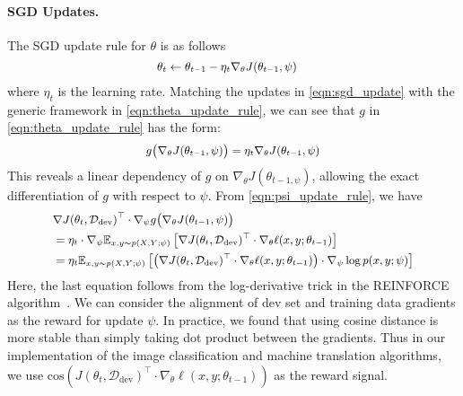 \paragraph{SGD Updates.} The SGD update rule for $\theta$ is as follows
\begin{equation}
  \label{eqn:sgd_update}
   \small
  \begin{aligned}
    \theta_t &\leftarrow \theta_{t-1} - \eta_t \nabla_\theta J(\theta_{t-1}, \psi)
  \end{aligned}
\end{equation}
where $\eta_t$ is the learning rate. Matching the updates in \autoref{eqn:sgd_update} with the generic framework in \autoref{eqn:theta_update_rule}, we can see that $g$ in \autoref{eqn:theta_update_rule} has the form: %
\begin{equation}
  \label{eqn:momentum_update_g}
   \small
  \begin{aligned}
    g\big(\nabla_\theta J(\theta_{t-1}, \psi)\big) = \eta_t \nabla_\theta J(\theta_{t-1}, \psi)
  \end{aligned}
\end{equation}
This reveals a linear dependency of $g$ on $\nabla_\theta J(\theta_{t-1, \psi})$, allowing the exact differentiation of $g$ with respect to $\psi$. From \autoref{eqn:psi_update_rule}, we have
\begin{equation}
  \label{eqn:momentum_update_for_psi}
   \small
  \begin{aligned}
    &\nabla J(\theta_t, \mathcal{D}_\text{dev})^\top \cdot \nabla_\psi g\big( \nabla_\theta J(\theta_{t-1}, \psi) \big) \\
    &= \eta_t \cdot \nabla_\psi \mathbb{E}_{x, y \sim p(X, Y; \psi)} \left[\nabla J(\theta_t, \mathcal{D}_\text{dev})^\top \cdot \nabla_\theta \ell(x, y; \theta_{t-1} )\right] \\
    &= \eta_t \mathbb{E}_{x, y \sim p(X, Y; \psi)} \left[\left(\nabla J(\theta_t, \mathcal{D}_\text{dev})^\top \cdot \nabla_\theta \ell(x, y; \theta_{t-1} ) \right) \cdot \nabla_\psi \log{p(x, y; \psi)} \right]
  \end{aligned}
\end{equation}
Here, the last equation follows from the log-derivative trick in the REINFORCE algorithm~\citep{reinforce}. We can consider the alignment of dev set and training data gradients as the reward for update $\psi$. In practice, we found that using cosine distance is more stable than simply taking dot product between the gradients. Thus in our implementation of the image classification and machine translation algorithms, we use $\text{cos}\left(J(\theta_t, \mathcal{D}_\text{dev})^\top \cdot \nabla_\theta \ell(x, y; \theta_{t-1} ) \right)$ as the reward signal.
